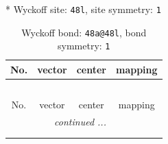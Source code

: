 \documentclass[fleqn,8pt]{jsarticle}
\begin{document}
* Wyckoff site: {\tt 48l}, site symmetry: {\tt 1}
\renewcommand{\arraystretch}{1.2}
\begin{longtable}{cccc}
\caption{Wyckoff bond: {\tt 48a@48l}, bond symmetry: {\tt 1}}
 \\
 \hline \hline
No. & vector & center & mapping \\ \hline \endfirsthead

\multicolumn{3}{l}{\tablename\ \thetable{}} \\
 \hline \hline
No. & vector & center & mapping \\ \hline \endhead

 \hline \hline
\multicolumn{3}{r}{\footnotesize\it continued ...} \\ \endfoot

 \hline \hline
\multicolumn{3}{r}{} \\ \endlastfoot


\end{longtable}
\end{document}
